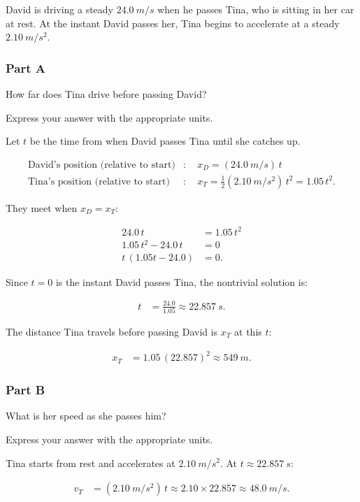 David is driving a steady \(\SI{24.0}{m/s}\) when he passes Tina, who is sitting in her car at rest. At the instant David passes her, Tina begins to accelerate at a steady \(\SI{2.10}{m/s^2}\).

\subsubsection{Part A}
How far does Tina drive before passing David?

Express your answer with the appropriate units.

\begin{solution}
	Let \( t \) be the time from when David passes Tina until she catches up.

	\begin{align*}
		\text{David's position (relative to start)} &:\quad x_D = (\SI{24.0}{m/s})\,t \\
		\text{Tina's position (relative to start)} &:\quad x_T = \frac{1}{2}(\SI{2.10}{m/s^2})\,t^2 = 1.05\,t^2.
	\end{align*}

	They meet when \( x_D = x_T \):

	\begin{align*}
		24.0\,t &= 1.05\,t^2 \\
		1.05\,t^2 - 24.0\,t &= 0 \\
		t\,(1.05t - 24.0) &= 0.
	\end{align*}

	Since \( t = 0 \) is the instant David passes Tina, the nontrivial solution is:

	\begin{align*}
		t &= \frac{24.0}{1.05} \approx \SI{22.857}{s}.
	\end{align*}

	The distance Tina travels before passing David is \( x_T \) at this \( t \):

	\begin{align*}
		x_T &= 1.05\,(22.857)^2 \approx \SI{549}{m}.
	\end{align*}
\end{solution}

\subsubsection{Part B}
What is her speed as she passes him?

Express your answer with the appropriate units.

\begin{solution}
	Tina starts from rest and accelerates at \( \SI{2.10}{m/s^2} \). At \( t \approx \SI{22.857}{s} \):

	\begin{align*}
		v_T &= (\SI{2.10}{m/s^2})\,t \approx 2.10 \times 22.857 \approx \SI{48.0}{m/s}.
	\end{align*}
\end{solution}

